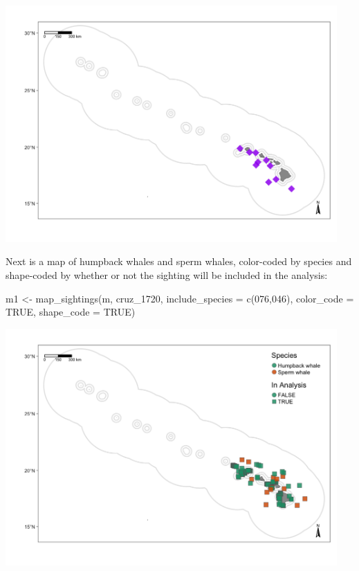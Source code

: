 \documentclass[
]{book}
\newenvironment{Shaded}{\begin{snugshade}}{\end{snugshade}}
\newcommand{\AttributeTok}[1]{\textcolor[rgb]{0.77,0.63,0.00}{#1}}
\newcommand{\ConstantTok}[1]{\textcolor[rgb]{0.00,0.00,0.00}{#1}}
\newcommand{\FunctionTok}[1]{\textcolor[rgb]{0.00,0.00,0.00}{#1}}
\newcommand{\NormalTok}[1]{#1}
\newcommand{\OtherTok}[1]{\textcolor[rgb]{0.56,0.35,0.01}{#1}}
\newcommand{\StringTok}[1]{\textcolor[rgb]{0.31,0.60,0.02}{#1}}
\begin{document}
\includegraphics[width=0.95\textwidth,height=\textheight]{img/map_sits2.png}

Next is a map of humpback whales and sperm whales, color-coded by species and shape-coded by whether or not the sighting will be included in the analysis:

\begin{Shaded}
\begin{Highlighting}[]
\NormalTok{m1 }\OtherTok{\textless{}{-}} \FunctionTok{map\_sightings}\NormalTok{(m, }
\NormalTok{                   cruz\_1720,}
                   \AttributeTok{include\_species =} \FunctionTok{c}\NormalTok{(}\StringTok{\textquotesingle{}076\textquotesingle{}}\NormalTok{,}\StringTok{\textquotesingle{}046\textquotesingle{}}\NormalTok{),}
                   \AttributeTok{color\_code =} \ConstantTok{TRUE}\NormalTok{,}
                   \AttributeTok{shape\_code =} \ConstantTok{TRUE}\NormalTok{)}
\end{Highlighting}
\end{Shaded}

\includegraphics[width=0.95\textwidth,height=\textheight]{img/map_sits3.png}
\end{document}
